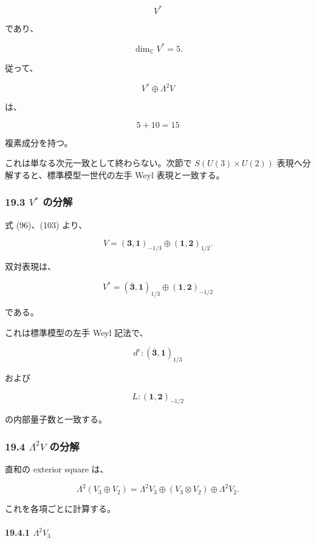 \documentclass[
  a4paper,
]{ltjsarticle}
\begin{document}
\[
V^*
\]

であり、

\[
\dim_{\mathbb C}V^*=5.
\]

従って、

\[
\boxed{
V^*\oplus\Lambda^2V
}
\tag{108}
\]

は、

\[
\boxed{
5+10=15
}
\tag{109}
\]

複素成分を持つ。

これは単なる次元一致として終わらない。次節で \(S(U(3)\times U(2))\)
表現へ分解すると、標準模型一世代の左手 Weyl 表現と一致する。

\subsubsection{\texorpdfstring{19.3 \(V^*\)
の分解}{19.3 V\^{}* の分解}}\label{v-ux306eux5206ux89e3}

式 (96)、(103) より、

\[
V
=
(\mathbf3,\mathbf1)_{-1/3}
\oplus
(\mathbf1,\mathbf2)_{1/2}.
\tag{110}
\]

双対表現は、

\[
\boxed{
V^*
=
(\overline{\mathbf3},\mathbf1)_{1/3}
\oplus
(\mathbf1,\mathbf2)_{-1/2}
}
\tag{111}
\]

である。

これは標準模型の左手 Weyl 記法で、

\[
\boxed{
d^c
:
(\overline{\mathbf3},\mathbf1)_{1/3}
}
\tag{112}
\]

および

\[
\boxed{
L
:
(\mathbf1,\mathbf2)_{-1/2}
}
\tag{113}
\]

の内部量子数と一致する。

\subsubsection{\texorpdfstring{19.4 \(\Lambda^2V\)
の分解}{19.4 \textbackslash Lambda\^{}2V の分解}}\label{lambda2v-ux306eux5206ux89e3}

直和の exterior square は、

\[
\Lambda^2(V_3\oplus V_2)
=
\Lambda^2V_3
\oplus
(V_3\otimes V_2)
\oplus
\Lambda^2V_2.
\tag{114}
\]

これを各項ごとに計算する。

\paragraph{\texorpdfstring{19.4.1
\(\Lambda^2V_3\)}{19.4.1 \textbackslash Lambda\^{}2V\_3}}\label{lambda2v_3}
\end{document}
